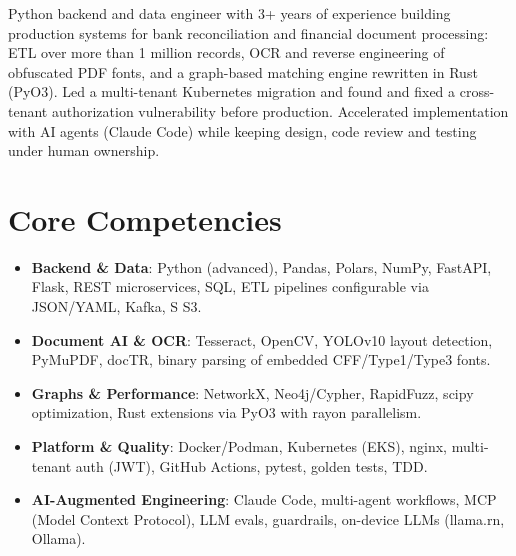 \documentclass[11pt,a4paper,sans]{moderncv}
\makeatletter
\newcommand*{\acr}[1]{\@acr#1\@nil}
\def\@acr#1#2\@nil{#1\ifx\relax#2\relax\else\kern0pt\@acr#2\@nil\fi}
\makeatother
\begin{document}
\makecvtitle


\vspace{6pt}
\small{Python backend and data engineer with 3+ years of experience building production systems for bank reconciliation and financial document processing: ETL over more than 1 million records, OCR and reverse engineering of obfuscated PDF fonts, and a graph-based matching engine rewritten in Rust (PyO3). Led a multi-tenant Kubernetes migration and found and fixed a cross-tenant authorization vulnerability before production. Accelerated implementation with AI agents (Claude Code) while keeping design, code review and testing under human ownership.}


\section{Core Competencies}
\vspace{1pt}
\begin{itemize}

\item \textbf{Backend \& Data}: Python (advanced), Pandas, Polars, NumPy, FastAPI, Flask, REST microservices, SQL, ETL pipelines configurable via JSON/YAML, Kafka, \acr{AWS} S3.

\item \textbf{Document AI \& OCR}: Tesseract, OpenCV, YOLOv10 layout detection, PyMuPDF, docTR, binary parsing of embedded CFF/Type1/Type3 fonts.

\item \textbf{Graphs \& Performance}: NetworkX, Neo4j/Cypher, RapidFuzz, scipy optimization, Rust extensions via PyO3 with rayon parallelism.

\item \textbf{Platform \& Quality}: Docker/Podman, Kubernetes (EKS), nginx, multi-tenant auth (JWT), GitHub Actions, pytest, golden tests, TDD.

\item \textbf{AI-Augmented Engineering}: Claude Code, multi-agent workflows, MCP (Model Context Protocol), LLM evals, guardrails, on-device LLMs (llama.rn, Ollama).

\end{itemize}
\end{document}
